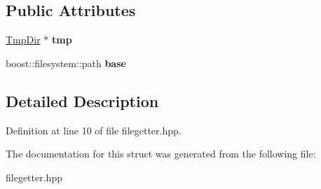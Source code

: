 \subsection*{Public Attributes}
\begin{DoxyCompactItemize}
\item 
\hypertarget{struct_file_getter_aff31699a9b1a042765d0afe2de707200}{\hyperlink{struct_tmp_dir}{Tmp\-Dir} $\ast$ {\bfseries tmp}}\label{struct_file_getter_aff31699a9b1a042765d0afe2de707200}

\item 
\hypertarget{struct_file_getter_a5b5d602950eb4d3442be28213b33985f}{boost\-::filesystem\-::path {\bfseries base}}\label{struct_file_getter_a5b5d602950eb4d3442be28213b33985f}

\end{DoxyCompactItemize}


\subsection{Detailed Description}


Definition at line 10 of file filegetter.\-hpp.



The documentation for this struct was generated from the following file\-:\begin{DoxyCompactItemize}
\item 
filegetter.\-hpp\end{DoxyCompactItemize}
